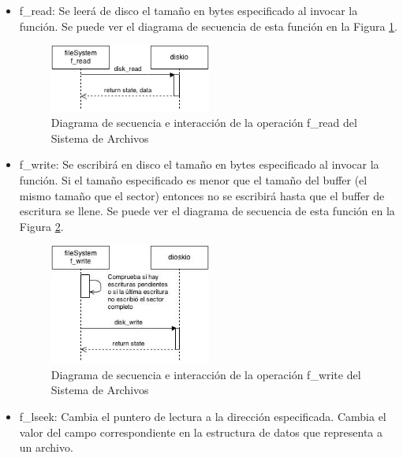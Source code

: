 \begin{itemize}
\item f\_read: Se leerá de disco el tamaño en bytes especificado al invocar la función. Se puede ver el diagrama de secuencia de esta función en la Figura \ref{fig:fread}.\\

\begin{figure}[!h]
\begin{center}
\includegraphics[width=0.5\textwidth]{figs/fread.png}
\caption{Diagrama de secuencia e interacción de la operación f\_read del Sistema de Archivos}
\label{fig:fread}
\end{center}
\end{figure}

\item f\_write: Se escribirá en disco el tamaño en bytes especificado al invocar la función. Si el tamaño especificado es menor que el tamaño del buffer (el mismo tamaño que el sector) entonces no se escribirá hasta que el buffer de escritura se llene. Se puede ver el diagrama de secuencia de esta función en la Figura \ref{fig:fwrite}.\\

\begin{figure}[!h]
\begin{center}
\includegraphics[width=0.5\textwidth]{figs/fwrite.png}
\caption{Diagrama de secuencia e interacción de la operación f\_write del Sistema de Archivos}
\label{fig:fwrite}
\end{center}
\end{figure}

\item f\_lseek: Cambia el puntero de lectura a la dirección especificada. Cambia el valor del campo correspondiente en la estructura de datos que representa a un archivo.\\



\end{itemize}
